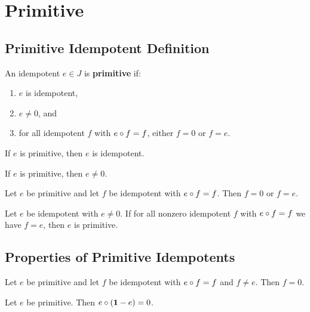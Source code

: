 \section{Primitive}

\subsection{Primitive Idempotent Definition}

\begin{definition}[IsPrimitive]
An idempotent $e \in J$ is \textbf{primitive} if:
\begin{enumerate}
  \item $e$ is idempotent,
  \item $e \ne 0$, and
  \item for all idempotent $f$ with $e \circ f = f$, either $f = 0$ or $f = e$.
\end{enumerate}
\end{definition}

\begin{lemma}
If $e$ is primitive, then $e$ is idempotent.
\end{lemma}

\begin{lemma}
If $e$ is primitive, then $e \ne 0$.
\end{lemma}

\begin{lemma}
Let $e$ be primitive and let $f$ be idempotent with $e \circ f = f$. Then $f = 0$ or $f = e$.
\end{lemma}

\begin{theorem}
Let $e$ be idempotent with $e \ne 0$. If for all nonzero idempotent $f$ with $e \circ f = f$ we have $f = e$, then $e$ is primitive.
\end{theorem}

\subsection{Properties of Primitive Idempotents}

\begin{theorem}
Let $e$ be primitive and let $f$ be idempotent with $e \circ f = f$ and $f \ne e$. Then $f = 0$.
\end{theorem}

\begin{theorem}
Let $e$ be primitive. Then $e \circ (\mathbf{1} - e) = 0$.
\end{theorem}

